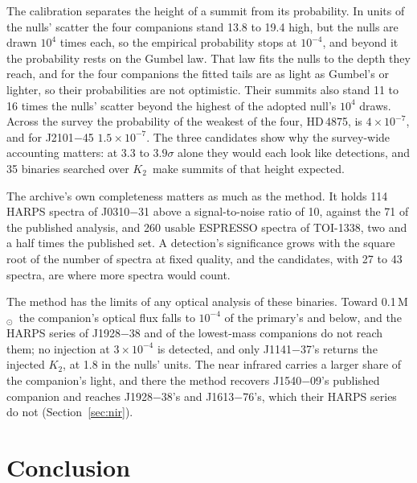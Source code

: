 \documentclass[3p,11pt]{elsarticle}
\newcommand{\Msun}{M$_\odot$}
\newcommand{\Ktwo}{$K_2$}
\begin{document}
The calibration separates the height of a summit from its probability. In units of the nulls'
scatter the four companions stand 13.8 to 19.4 high, but the nulls are drawn $10^4$ times each, so
the empirical probability stops at $10^{-4}$, and beyond it the probability rests on the Gumbel
law. That law fits the nulls to the depth they reach, and for the four companions the fitted
tails are as light as Gumbel's or lighter, so their probabilities are not optimistic. Their
summits also stand 11 to 16 times the nulls' scatter beyond the highest of the adopted null's
$10^4$ draws.
Across the survey the probability of the weakest of the four, HD\,4875, is $4\times10^{-7}$,
and for J2101$-$45 $1.5\times10^{-7}$. The three candidates show why the survey-wide accounting
matters: at 3.3 to $3.9\sigma$ alone they would each look like detections, and 35 binaries searched
over \Ktwo\ make summits of that height expected.

The archive's own completeness matters as much as the method. It holds 114 HARPS spectra of
J0310$-$31 above a signal-to-noise ratio of 10, against the 71 of the published analysis, and 260
usable ESPRESSO spectra of TOI-1338, two and a half times the published set. A detection's
significance grows with the square root of the number of spectra at fixed quality, and the
candidates, with 27 to 43 spectra, are where more spectra would count.

The method has the limits of any optical analysis of these binaries. Toward 0.1\,\Msun\ the
companion's optical flux falls to $10^{-4}$ of the primary's and below, and the HARPS series of
J1928$-$38 and of the lowest-mass companions do not reach them; no injection at
$3\times10^{-4}$ is detected, and only J1141$-$37's returns the injected \Ktwo, at 1.8 in the
nulls' units. The near infrared carries a larger share of the
companion's light, and there the method recovers J1540$-$09's published companion and reaches
J1928$-$38's and J1613$-$76's, which their HARPS series do not (Section~\ref{sec:nir}).

\section{Conclusion}\label{sec:conclusion}
\end{document}
